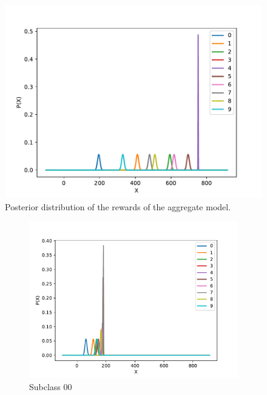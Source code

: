 \documentclass[12pt,a4paper]{report}
\begin{document}
\begin{figure}[H]
\centering
  \includegraphics[scale = 0.7, center]{4gen}
  \caption{Posterior distribution of the rewards of the aggregate model.}
\end{figure}\begin{figure}[H]
\renewcommand*\thesubfigure{\roman{subfigure}} 
\centering
\begin{subfigure}{.49\textwidth}
  \centering
  \includegraphics[width=1\linewidth]{4_00}
  \caption{Subclass 00}
  \label{fig:sub1}
\end{subfigure}
\begin{subfigure}{.49\textwidth}
  \centering

\end{subfigure}
\end{figure}
\end{document}
